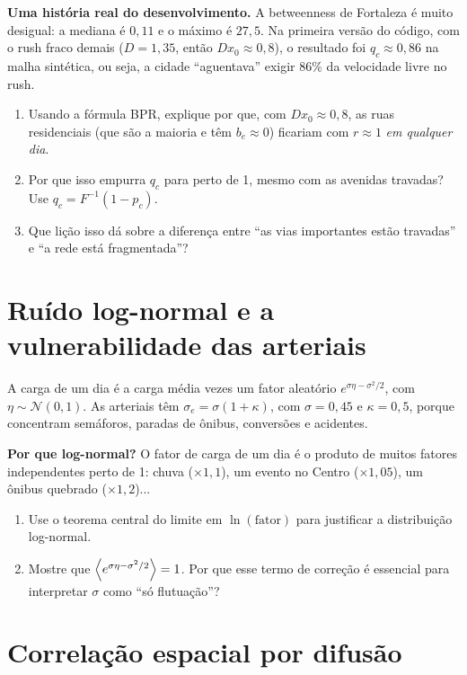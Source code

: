 \documentclass[11pt]{article}
\begin{document}
 \textbf{Uma história real do desenvolvimento.} A betweenness de Fortaleza é muito desigual: a mediana é $0{,}11$ e o máximo é $27{,}5$. Na primeira versão do código, com o rush fraco demais ($D = 1{,}35$, então $Dx_0\approx0{,}8$), o resultado foi $q_c\approx0{,}86$ na malha sintética, ou seja, a cidade ``aguentava'' exigir 86\% da velocidade livre no rush.
\begin{enumerate}
  \item Usando a fórmula BPR, explique por que, com $Dx_0\approx0{,}8$, as ruas residenciais (que são a maioria e têm $b_e\approx0$) ficariam com $r\approx1$ \emph{em qualquer dia}.
  \item Por que isso empurra $q_c$ para perto de 1, mesmo com as avenidas travadas? Use $q_c = F^{-1}(1-p_c)$.
  \item Que lição isso dá sobre a diferença entre ``as vias importantes estão travadas'' e ``a rede está fragmentada''?
\end{enumerate}

\section{Ruído log-normal e a vulnerabilidade das arteriais}

A carga de um dia é a carga média vezes um fator aleatório $e^{\sigma\eta-\sigma^2/2}$, com $\eta\sim\mathcal N(0,1)$. As arteriais têm $\sigma_e = \sigma(1+\kappa)$, com $\sigma = 0{,}45$ e $\kappa=0{,}5$, porque concentram semáforos, paradas de ônibus, conversões e acidentes.

 \textbf{Por que log-normal?} O fator de carga de um dia é o produto de muitos fatores independentes perto de 1: chuva ($\times1{,}1$), um evento no Centro ($\times1{,}05$), um ônibus quebrado ($\times1{,}2$)...
\begin{enumerate}
  \item Use o teorema central do limite em $\ln(\text{fator})$ para justificar a distribuição log-normal.
  \item Mostre que $\left\langle e^{\sigma\eta-\sigma^2/2} \right\rangle = 1$. Por que esse termo de correção é essencial para interpretar $\sigma$ como ``só flutuação''?
\end{enumerate}

\section{Correlação espacial por difusão}
\end{document}
